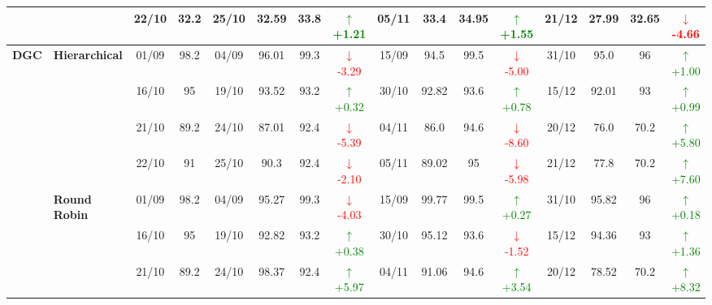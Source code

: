 {\begin{longtable}{llcc|cccc|cccc|cccc}
&
& 22/10 & 32.2 & 25/10 & 32.59 & 33.8 & \textcolor{green}{\(\uparrow\)+1.21} & 05/11 & 33.4 & 34.95 & \textcolor{green}{\(\uparrow\)+1.55} & 21/12 & 27.99 & 32.65 & \textcolor{red}{\(\downarrow\)-4.66} \\
\midrule




\multirow{12}{*}{\textbf{DGC}} 
& \textbf{Hierarchical}
& 01/09 & 98.2 & 04/09 & 96.01 & 99.3 & \textcolor{red}{\(\downarrow\)-3.29} & 15/09 & 94.5 & 99.5 & \textcolor{red}{\(\downarrow\)-5.00} & 31/10 & 95.0 & 96 & \textcolor{green}{\(\uparrow\)+1.00} \\

&
& 16/10 & 95 & 19/10 & 93.52 & 93.2 & \textcolor{green}{\(\uparrow\)+0.32} & 30/10 & 92.82 & 93.6 & \textcolor{green}{\(\uparrow\)+0.78} & 15/12 & 92.01 & 93 & \textcolor{green}{\(\uparrow\)+0.99} \\

&
& 21/10 & 89.2 & 24/10 & 87.01 & 92.4 & \textcolor{red}{\(\downarrow\)-5.39} & 04/11 & 86.0 & 94.6 & \textcolor{red}{\(\downarrow\)-8.60} & 20/12 & 76.0 & 70.2 & \textcolor{green}{\(\uparrow\)+5.80} \\

&
& 22/10 & 91 & 25/10 & 90.3 & 92.4 & \textcolor{red}{\(\downarrow\)-2.10} & 05/11 & 89.02 & 95 & \textcolor{red}{\(\downarrow\)-5.98} & 21/12 & 77.8 & 70.2 & \textcolor{green}{\(\uparrow\)+7.60} \\
\cmidrule(lr){2-16}


& \textbf{Round Robin}
& 01/09 & 98.2 & 04/09 & 95.27 & 99.3 & \textcolor{red}{\(\downarrow\)-4.03} & 15/09 & 99.77 & 99.5 & \textcolor{green}{\(\uparrow\)+0.27} & 31/10 & 95.82 & 96 & \textcolor{green}{\(\uparrow\)+0.18} \\

&
& 16/10 & 95 & 19/10 & 92.82 & 93.2 & \textcolor{green}{\(\uparrow\)+0.38} & 30/10 & 95.12 & 93.6 & \textcolor{red}{\(\downarrow\)-1.52} & 15/12 & 94.36 & 93 & \textcolor{green}{\(\uparrow\)+1.36} \\

&
& 21/10 & 89.2 & 24/10 & 98.37 & 92.4 & \textcolor{green}{\(\uparrow\)+5.97} & 04/11 & 91.06 & 94.6 & \textcolor{green}{\(\uparrow\)+3.54} & 20/12 & 78.52 & 70.2 & \textcolor{green}{\(\uparrow\)+8.32} \\


\end{longtable}}
